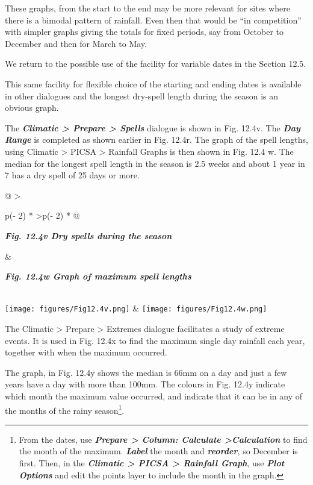\documentclass[
  letterpaper,
  DIV=11,
  numbers=noendperiod]{scrreprt}
\begin{document}
These graphs, from the start to the end may be more relevant for sites
where there is a bimodal pattern of rainfall. Even then that would be
``in competition'' with simpler graphs giving the totals for fixed
periods, say from October to December and then for March to May.

We return to the possible use of the facility for variable dates in the
Section 12.5.

This same facility for flexible choice of the starting and ending dates
is available in other dialogues and the longest dry-spell length during
the season is an obvious graph.

The \textbf{\emph{Climatic \textgreater{} Prepare \textgreater{}
Spells}} dialogue is shown in Fig. 12.4v. The \textbf{\emph{Day Range}}
is completed as shown earlier in Fig. 12.4r. The graph of the spell
lengths, using Climatic \textgreater{} PICSA \textgreater{} Rainfall
Graphs is then shown in Fig. 12.4 w. The median for the longest spell
length in the season is 2.5 weeks and about 1 year in 7 has a dry spell
of 25 days or more.

\begin{longtable}[]{@{}
  >{\raggedright\arraybackslash}p{(\columnwidth - 2\tabcolsep) * }
  >{\raggedleft\arraybackslash}p{(\columnwidth - 2\tabcolsep) * }@{}}
\toprule\noalign{}
\begin{minipage}[b]{\linewidth}\raggedright
\textbf{\emph{Fig. 12.4v Dry spells during the season}}
\end{minipage} & \begin{minipage}[b]{\linewidth}\raggedleft
\textbf{\emph{Fig. 12.4w Graph of maximum spell lengths}}
\end{minipage} \\
\midrule\noalign{}
\endhead
\bottomrule\noalign{}
\endlastfoot
\texttt{[image: figures/Fig12.4v.png]}
&
\texttt{[image: figures/Fig12.4w.png]} \\
\end{longtable}

The Climatic \textgreater{} Prepare \textgreater{} Extremes dialogue
facilitates a study of extreme events. It is used in Fig. 12.4x to find
the maximum single day rainfall each year, together with when the
maximum occurred.

The graph, in Fig. 12.4y shows the median is 66mm on a day and just a
few years have a day with more than 100mm. The colours in Fig. 12.4y
indicate which month the maximum value occurred, and indicate that it
can be in any of the months of the rainy season\footnote{From the dates,
  use \textbf{\emph{Prepare \textgreater{} Column: Calculate
  \textgreater Calculation}} to find the month of the maximum.
  \textbf{\emph{Label}} the month and \textbf{\emph{reorder}}, so
  December is first. Then, in the \textbf{\emph{Climatic \textgreater{}
  PICSA \textgreater{} Rainfall Graph}}, use \textbf{\emph{Plot
  Options}} and edit the points layer to include the month in the graph.}.
\end{document}
